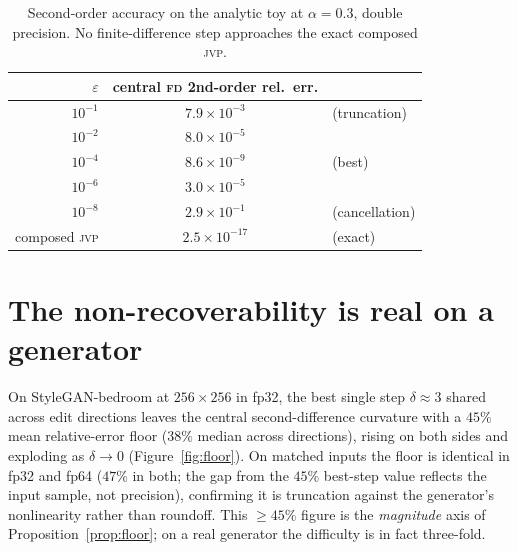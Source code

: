 \documentclass[10pt]{article}
\newcommand{\jvp}{\textsc{jvp}}
\newcommand{\fd}{\textsc{fd}}
\newcommand{\eps}{\varepsilon}
\begin{document}
\begin{table}[h]\centering
\begin{tabular}{rcl}
\toprule
$\eps$ & central \fd{} 2nd-order rel.\ err. & \\
\midrule
$10^{-1}$ & $7.9\times10^{-3}$ & (truncation) \\
$10^{-2}$ & $8.0\times10^{-5}$ & \\
$10^{-4}$ & $8.6\times10^{-9}$ & (best) \\
$10^{-6}$ & $3.0\times10^{-5}$ & \\
$10^{-8}$ & $2.9\times10^{-1}$ & (cancellation) \\
\midrule
composed \jvp & $2.5\times10^{-17}$ & (exact) \\
\bottomrule
\end{tabular}
\caption{Second-order accuracy on the analytic toy at $\alpha=0.3$, double precision. No
finite-difference step approaches the exact composed \jvp{}.}
\label{tab:toy}
\end{table}

\section{The non-recoverability is real on a generator}
\label{sec:real}
On StyleGAN-bedroom at $256{\times}256$ in fp32, the best single step $\delta\!\approx\!3$ shared across
edit directions leaves the central second-difference curvature with a $45\%$ mean relative-error floor
($38\%$ median across directions), rising on both sides and exploding as $\delta\to0$
(Figure~\ref{fig:floor}). On matched inputs the floor is identical in fp32 and fp64 ($47\%$ in both; the
gap from the $45\%$ best-step value reflects the input sample, not precision), confirming it is truncation
against the generator's nonlinearity rather than roundoff. This $\geq45\%$ figure is the \emph{magnitude}
axis of Proposition~\ref{prop:floor}; on a real generator the difficulty is in fact three-fold.
\end{document}
